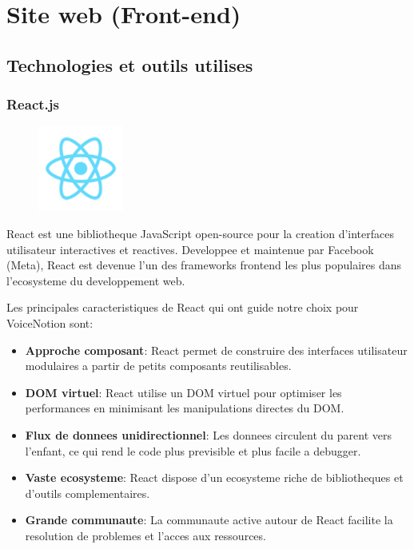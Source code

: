 \section{Site web (Front-end)}
\subsection{Technologies et outils utilises}

\subsubsection{React.js}
\begin{figure}
    \centering
    \includegraphics[width=0.25\textwidth]{assets/docs/logo_react.png}
\end{figure}
React est une bibliotheque JavaScript open-source pour la creation d'interfaces utilisateur interactives et reactives. Developpee et maintenue par Facebook (Meta), React est devenue l'un des frameworks frontend les plus populaires dans l'ecosysteme du developpement web.

Les principales caracteristiques de React qui ont guide notre choix pour VoiceNotion sont:

\begin{itemize}
    \item \textbf{Approche composant}: React permet de construire des interfaces utilisateur modulaires a partir de petits composants reutilisables.
    \item \textbf{DOM virtuel}: React utilise un DOM virtuel pour optimiser les performances en minimisant les manipulations directes du DOM.
    \item \textbf{Flux de donnees unidirectionnel}: Les donnees circulent du parent vers l'enfant, ce qui rend le code plus previsible et plus facile a debugger.
    \item \textbf{Vaste ecosysteme}: React dispose d'un ecosysteme riche de bibliotheques et d'outils complementaires.
    \item \textbf{Grande communaute}: La communaute active autour de React facilite la resolution de problemes et l'acces aux ressources.
\end{itemize}

